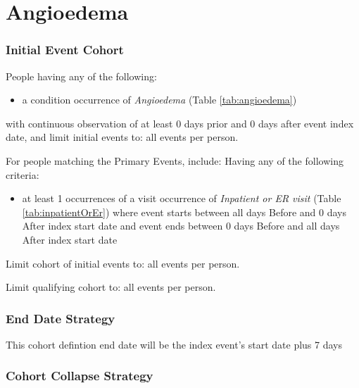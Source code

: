 \documentclass[11pt]{book}
\providecommand{\tightlist}{%
  \setlength{\itemsep}{0pt}\setlength{\parskip}{0pt}}
\theoremstyle{definition}
\theoremstyle{definition}
\theoremstyle{definition}
\theoremstyle{remark}
\begin{document}
\hypertarget{Angioedema}{%
\section{Angioedema}\label{Angioedema}}

\hypertarget{initial-event-cohort-3}{%
\subsubsection*{Initial Event Cohort}\label{initial-event-cohort-3}}

People having any of the following:

\begin{itemize}
\tightlist
\item
  a condition occurrence of \emph{Angioedema} (Table \ref{tab:angioedema})
\end{itemize}

with continuous observation of at least 0 days prior and 0 days after event index date, and limit initial events to: all events per person.

For people matching the Primary Events, include:
Having any of the following criteria:

\begin{itemize}
\tightlist
\item
  at least 1 occurrences of a visit occurrence of \emph{Inpatient or ER visit} (Table \ref{tab:inpatientOrEr}) where event starts between all days Before and 0 days After index start date and event ends between 0 days Before and all days After index start date
\end{itemize}

Limit cohort of initial events to: all events per person.

Limit qualifying cohort to: all events per person.

\hypertarget{end-date-strategy-3}{%
\subsubsection*{End Date Strategy}\label{end-date-strategy-3}}

This cohort defintion end date will be the index event's start date plus 7 days

\hypertarget{cohort-collapse-strategy-3}{%
\subsubsection*{Cohort Collapse Strategy}\label{cohort-collapse-strategy-3}}
\end{document}

